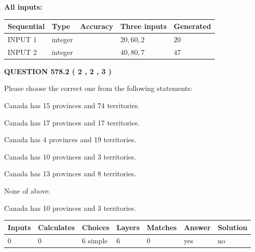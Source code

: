 \documentclass[12pt]{article}
\begin{document}
   
   
   
\noindent\vspace{0.1in}\hspace{-0.08in} {\textbf{\Large{All inputs: }}}
   
   
  
  
\noindent\begin{tabular}{|l|l|l|l|l|}
\hline
 Sequential & Type & Accuracy & Three inputs & Generated \\ 
\hline
 
 
  INPUT $  1 $ & integer &  & $
 20
 , 
 60
 , 
 2
 $ & $ 20 $ 
 \\  \hline  
 
 
  INPUT $  2 $ & integer &  & $
 40
 , 
 80
 , 
 7
 $ & $ 47 $ 
 \\  \hline  
 \end{tabular}
   
   
  
\vspace{0.2in}
  
{\textbf{\Large{QUESTION
578.2 
 ( 2 , 2 , 3 )
}}}
  
  
Please choose the correct one from the following statements:
 
 
Canada has  15 provinces and  74 territories.
 
 
Canada has  17 provinces and  17 territories.
 
 
Canada has   4 provinces and  19 territories.
 
 
Canada has 10  provinces and 3 territories.
 
 
Canada has  13 provinces and  8 territories.
 
 
 None of above.
 
 
\noindent{}
 
 
Canada has 10  provinces and 3 territories.
 
 
\noindent{}
 
 
   
   
   
   
\noindent\begin{tabular}{|l|l|l|l|l|l|l|}
 \hline
Inputs & Calculates & Choices & Layers & Matches & Answer & Solution \\ \hline
 0  & 
 0  & 
 6
  simple  
  & 
 6  & 
 0  & 
  yes & 
  no 
  \\ \hline
 \end{tabular}
   
\end{document}
